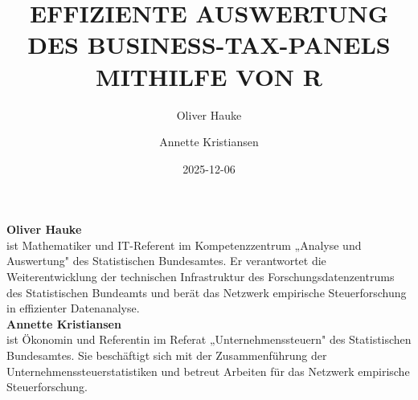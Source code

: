 \documentclass[
  german,
  10pt,
  twoside]{article}
\title{EFFIZIENTE AUSWERTUNG DES BUSINESS-TAX-PANELS MITHILFE VON R}
\author{Oliver Hauke \and Annette Kristiansen}
\date{2025-12-06}
\renewcommand{\maketitle}{}
\begin{document}
\maketitle

\begin{titlepage}
\thispagestyle{empty}
\pagestyle{empty}
\onecolumn

\noindent{\color{wistaBlue}\rule{\textwidth}{1pt}}

\vspace{-0.5cm}


\vspace*{0.5cm}

\begin{minipage}[t]{3.9cm}
%
\raggedleft
{}
\fontsize{7}{8.5}\selectfont
\vspace{0pt}%
{\fontsize{8}{9.5}\selectfont\color{wistaBlue}\textbf{Oliver Hauke}}\\[0.15cm]
ist Mathematiker und IT-Referent im Kompetenzzentrum „Analyse und Auswertung" des Statistischen Bundesamtes. Er verantwortet die Weiterentwicklung der technischen Infrastruktur des Forschungsdatenzentrums des Statistischen Bundeamts und berät das Netzwerk empirische Steuerforschung in effizienter Datenanalyse.\\[0.5cm]

{\fontsize{8}{9.5}\selectfont\color{wistaBlue}\textbf{Annette Kristiansen}}\\[0.15cm]
ist Ökonomin und Referentin im Referat „Unternehmenssteuern" des Statistischen Bundesamtes. Sie beschäftigt sich mit der Zusammenführung der Unternehmenssteuerstatistiken und betreut Arbeiten für das Netzwerk empirische Steuerforschung. 

\end{minipage}%
\hspace{0.4cm}%
\hspace{0.4cm}%
\begin{minipage}[t]{11.8cm}
\raggedright
\vspace{1.2cm}%


\end{minipage}
\end{titlepage}
\end{document}
